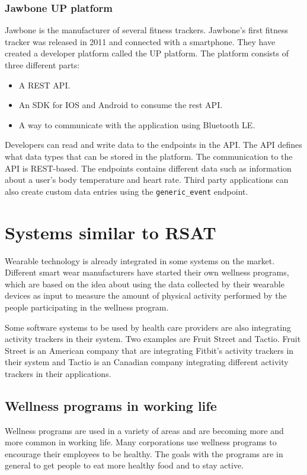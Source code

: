 \documentclass{cslthse-msc}
\begin{document}
\subsubsection{Jawbone UP platform}

Jawbone is the manufacturer of several fitness trackers. Jawbone's first fitness tracker was released in 2011 and connected with a smartphone\cite{guo2013evaluation}. They have created a developer platform called the UP platform. The platform consists of three different parts\cite{JawboneDeveloper}:

\begin{itemize}
\item A REST API.
\item An SDK for IOS and Android to consume the rest API.
\item A way to communicate with the application using Bluetooth LE.
\end{itemize}

Developers can read and write data to the endpoints in the API. The API defines what data types that can be stored in the platform. The communication to the API is REST-based. The endpoints contains different data such as information about a user's body temperature and heart rate. Third party applications can also create custom data entries using the \verb!generic_event! endpoint.\cite{JawboneCustomEndpoint}

\section{Systems similar to RSAT}

Wearable technology is already integrated in some systems on the market. Different smart wear manufacturers have started their own wellness programs, which are based on the idea about using the data collected by their wearable devices as input to measure the amount of physical activity performed by the people participating in the wellness program. 

Some software systems to be used by health care providers are also integrating activity trackers in their system. Two examples are Fruit Street and Tactio. Fruit Street is an American company that are integrating Fitbit's activity trackers in their system and Tactio is an Canadian company integrating different activity trackers in their applications.

\subsection{Wellness programs in working life}
\label{sec:wellness-programs}
Wellness programs are used in a variety of areas and are becoming more and more common in working life. Many corporations use wellness programs to encourage their employees to be healthy. The goals with the programs are in general to get people to eat more healthy food and to stay active.
\end{document}
